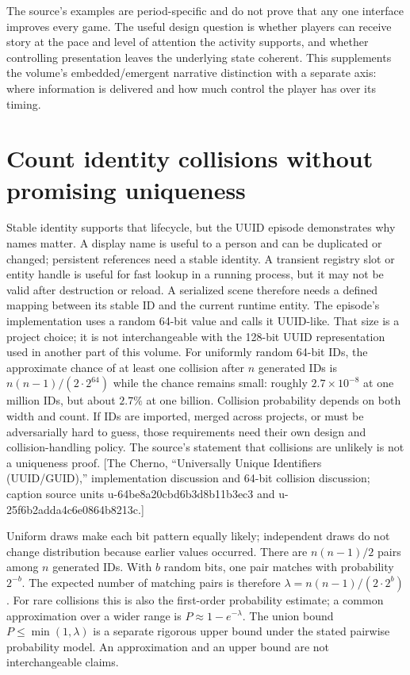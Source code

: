 The source's examples are period-specific and do not prove that any one interface improves every game. The useful design question is whether players can receive story at the pace and level of attention the activity supports, and whether controlling presentation leaves the underlying state coherent. This supplements the volume's embedded/emergent narrative distinction with a separate axis: where information is delivered and how much control the player has over its timing.

\section{Count identity collisions without promising uniqueness}\label{06-engine-ii-ch047-count-identity-collisions-without-promising-uniqueness}

\hypertarget{06-engine-ii-ch047-count-identity-collisions-without-promising-uniqueness}{}

Stable identity supports that lifecycle, but the UUID episode demonstrates why names matter. A display name is useful to a person and can be duplicated or changed; persistent references need a stable identity. A transient registry slot or entity handle is useful for fast lookup in a running process, but it may not be valid after destruction or reload. A serialized scene therefore needs a defined mapping between its stable ID and the current runtime entity. The episode's implementation uses a random 64-bit value and calls it UUID-like. That size is a project choice; it is not interchangeable with the 128-bit UUID representation used in another part of this volume. For uniformly random 64-bit IDs, the approximate chance of at least one collision after \(n\) generated IDs is \(n(n-1)/(2\cdot 2^{64})\) while the chance remains small: roughly \(2.7\times10^{-8}\) at one million IDs, but about \(2.7\%\) at one billion. Collision probability depends on both width and count. If IDs are imported, merged across projects, or must be adversarially hard to guess, those requirements need their own design and collision-handling policy. The source's statement that collisions are unlikely is not a uniqueness proof. {[}The Cherno, ``Universally Unique Identifiers (UUID/GUID),'' implementation discussion and 64-bit collision discussion; caption source units u-64be8a20cbd6b3d8b11b3ec3 and u-25f6b2adda4c6e0864b8213c.{]}

Uniform draws make each bit pattern equally likely; independent draws do not change distribution because earlier values occurred. There are \(n(n-1)/2\) pairs among \(n\) generated IDs. With \(b\) random bits, one pair matches with probability \(2^{-b}\). The expected number of matching pairs is therefore \(\lambda=n(n-1)/(2\cdot2^b)\). For rare collisions this is also the first-order probability estimate; a common approximation over a wider range is \(P\approx1-e^{-\lambda}\). The union bound \(P\le\min(1,\lambda)\) is a separate rigorous upper bound under the stated pairwise probability model. An approximation and an upper bound are not interchangeable claims.

